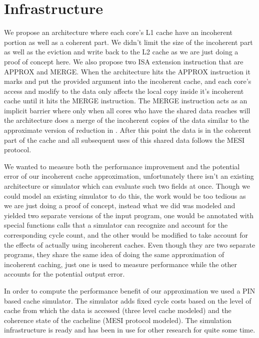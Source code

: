 \documentclass[12pt,conference]{IEEEtran}
\begin{document}
\section{Infrastructure}

We propose an architecture where each core's L1 cache have an incoherent
portion as well as a coherent part. We didn't limit the size of the 
incoherent part as well as the eviction and write back to the L2 cache as
we are just doing a proof of concept here. We also propose two ISA extension
instruction that are APPROX and MERGE. When the architecture hits the 
APPROX instruction it marks and put the provided argument into the incoherent
cache, and each core's access and modify to the data only affects the local
copy inside it's incoherent cache until it hits the MERGE instruction. The
MERGE instruction acts as an implicit barrier where only when all cores
who have the shared data reaches will the architecture does a merge of the
incoherent copies of the data similar to the approximate version of reduction
in \cite{paraprox}. After this point the data is in the coherent part of the
cache and all subsequent uses of this shared data follows the MESI protocol.

We wanted to measure both the performance improvement and the potential
error of our incoherent cache approximation, unfortunately there isn't
an existing architecture or simulator which can evaluate such two fields at
once. Though we could model an existing simulator to do this, the work
would be too tedious as we are just doing a proof of concept, instead
what we did was modeled and yielded two separate versions of the input
program, one would be annotated with special functions calls that a
simulator can recognize and account for the corresponding cycle count,
and the other would be modified to take account for the effects of
actually using incoherent caches. Even though they are two separate 
programs, they share the same idea of doing the same approximation of
incoherent caching, just one is used to measure performance while the
other accounts for the potential output error.

In order to compute the performance benefit of our approximation
we used a PIN\cite{pin} based cache simulator. The simulator adds 
fixed cycle costs based on the level of cache from which the
data is accessed (three level cache modeled) and the coherence
state of the cacheline (MESI protocol modeled). The simulation
infrastructure is ready and has been in use for other research
for quite some time.
\end{document}
